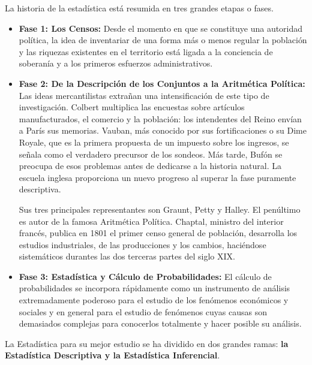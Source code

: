 \documentclass[a4paper]{report} %
\begin{document}
La historia de la estad\'istica est\'a resumida en tres grandes etapas o fases.

\begin{itemize}
    \item \textbf{Fase 1: Los Censos:} Desde el momento en que se constituye una autoridad pol\'itica, la idea de inventariar de una forma m\'as o menos regular la poblaci\'on y las riquezas existentes en el territorio est\'a ligada a la conciencia de soberan\'ia y a los primeros esfuerzos administrativos.
    \item \textbf{Fase 2: De la Descripci\'on de los Conjuntos a la Aritm\'etica Pol\'itica:} Las ideas mercantilistas extra\~nan una intensificaci\'on de este tipo de investigaci\'on. Colbert multiplica las encuestas sobre art\'iculos manufacturados, el comercio y la poblaci\'on: los intendentes del Reino env\'ian a Par\'is sus memorias. Vauban, m\'as conocido por sus fortificaciones o su Dime Royale, que es la primera propuesta de un impuesto sobre los ingresos, se se\~nala como el verdadero precursor de los sondeos. M\'as tarde, Buf\'on se preocupa de esos problemas antes de dedicarse a la historia natural. La escuela inglesa proporciona un nuevo progreso al superar la fase puramente descriptiva.

Sus tres principales representantes son Graunt, Petty y Halley. El pen\'ultimo es autor de la famosa Aritm\'etica Pol\'itica. Chaptal, ministro del interior franc\'es, publica en 1801 el primer censo general de poblaci\'on, desarrolla los estudios industriales, de las producciones y los cambios, haci\'endose sistem\'aticos durantes las dos terceras partes del siglo XIX.

\item \textbf{Fase 3: Estad\'istica y C\'alculo de Probabilidades:} El c\'alculo de probabilidades se incorpora r\'apidamente como un instrumento de an\'alisis extremadamente poderoso para el estudio de los fen\'omenos econ\'omicos y sociales y en general para el estudio de fen\'omenos cuyas causas son demasiados complejas para conocerlos totalmente y hacer posible su an\'alisis.

\end{itemize}


La Estad\'istica para su mejor estudio se ha dividido en dos grandes ramas: \textbf{la Estad\'istica Descriptiva y la Estad\'istica Inferencial}.
\end{document}
